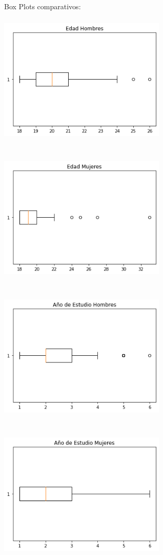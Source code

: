 \documentclass{article}
\begin{document}
Box Plots comparativos:\vspace{0.25cm}\\
\includegraphics[width=8cm, height=7cm]{Edad_hombres}
\includegraphics[width=8cm, height=7cm]{Edad_mujeres}
\includegraphics[width=8cm, height=7cm]{Year_hombres}
\includegraphics[width=8cm, height=7cm]{Year_mujeres}
\end{document}
